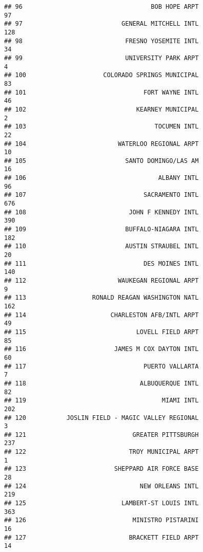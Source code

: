 \documentclass[
]{article}
\begin{document}
\begin{verbatim}
## 96                                   BOB HOPE ARPT                          97
## 97                           GENERAL MITCHELL INTL                         128
## 98                            FRESNO YOSEMITE INTL                          34
## 99                            UNIVERSITY PARK ARPT                           4
## 100                     COLORADO SPRINGS MUNICIPAL                          83
## 101                                FORT WAYNE INTL                          46
## 102                              KEARNEY MUNICIPAL                           2
## 103                                   TOCUMEN INTL                          22
## 104                         WATERLOO REGIONAL ARPT                          10
## 105                           SANTO DOMINGO/LAS AM                          16
## 106                                    ALBANY INTL                          96
## 107                                SACRAMENTO INTL                         676
## 108                            JOHN F KENNEDY INTL                         390
## 109                           BUFFALO-NIAGARA INTL                         182
## 110                           AUSTIN STRAUBEL INTL                          20
## 111                                DES MOINES INTL                         140
## 112                         WAUKEGAN REGIONAL ARPT                           9
## 113                  RONALD REAGAN WASHINGTON NATL                         162
## 114                       CHARLESTON AFB/INTL ARPT                          49
## 115                              LOVELL FIELD ARPT                          85
## 116                        JAMES M COX DAYTON INTL                          60
## 117                                PUERTO VALLARTA                           7
## 118                               ALBUQUERQUE INTL                          82
## 119                                     MIAMI INTL                         202
## 120           JOSLIN FIELD - MAGIC VALLEY REGIONAL                           3
## 121                             GREATER PITTSBURGH                         237
## 122                            TROY MUNICIPAL ARPT                           1
## 123                        SHEPPARD AIR FORCE BASE                          28
## 124                               NEW ORLEANS INTL                         219
## 125                          LAMBERT-ST LOUIS INTL                         363
## 126                             MINISTRO PISTARINI                          16
## 127                            BRACKETT FIELD ARPT                          14

\end{verbatim}
\end{document}
